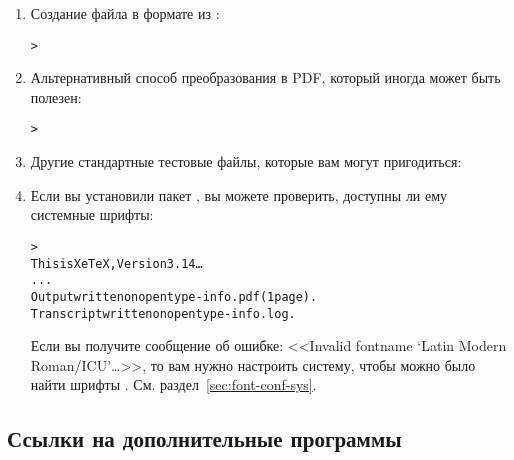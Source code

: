 \documentclass{article}
\renewcommand{\samp}[1]{<<\texttt{#1}>>}
\begin{document}
\begin{enumerate}
\item Создание файла в формате \PS{} из \dvi{}:
\begin{alltt}
> 
\end{alltt}

\item Альтернативный способ преобразования \dvi{} в PDF, который
  иногда может быть полезен:
\begin{alltt}
> 
\end{alltt}


\item Другие стандартные тестовые файлы, которые вам могут пригодиться:


\item Если вы установили пакет , вы можете проверить,
  доступны ли ему системные шрифты:
\begin{alltt}
> 
This is XeTeX, Version 3.14\dots
...
Output written on opentype-info.pdf (1 page).
Transcript written on opentype-info.log.
\end{alltt}

Если вы получите сообщение об ошибке: <<Invalid fontname `Latin Modern
Roman/ICU'\dots>>, то вам нужно настроить систему, чтобы можно было
найти шрифты \TL.  См. раздел~\ref{sec:font-conf-sys}.

\end{enumerate}

\subsection{Ссылки на дополнительные программы}
\end{document}
